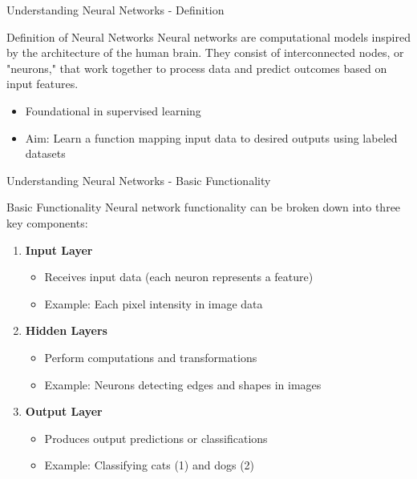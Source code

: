 \documentclass[aspectratio=169]{beamer}
\begin{document}
\begin{frame}[fragile]{Understanding Neural Networks - Definition}
    \begin{block}{Definition of Neural Networks}
    Neural networks are computational models inspired by the architecture of the human brain. They consist of interconnected nodes, or "neurons," that work together to process data and predict outcomes based on input features. 
    \end{block}
    \begin{itemize}
        \item Foundational in supervised learning
        \item Aim: Learn a function mapping input data to desired outputs using labeled datasets
    \end{itemize}
\end{frame}

\begin{frame}[fragile]{Understanding Neural Networks - Basic Functionality}
    \begin{block}{Basic Functionality}
        Neural network functionality can be broken down into three key components:
    \end{block}
    \begin{enumerate}
        \item \textbf{Input Layer}
            \begin{itemize}
                \item Receives input data (each neuron represents a feature)
                \item Example: Each pixel intensity in image data
            \end{itemize}
        \item \textbf{Hidden Layers}
            \begin{itemize}
                \item Perform computations and transformations 
                \item Example: Neurons detecting edges and shapes in images
            \end{itemize}
        \item \textbf{Output Layer}
            \begin{itemize}
                \item Produces output predictions or classifications
                \item Example: Classifying cats (1) and dogs (2)
            \end{itemize}
    \end{enumerate}
\end{frame}
\end{document}

